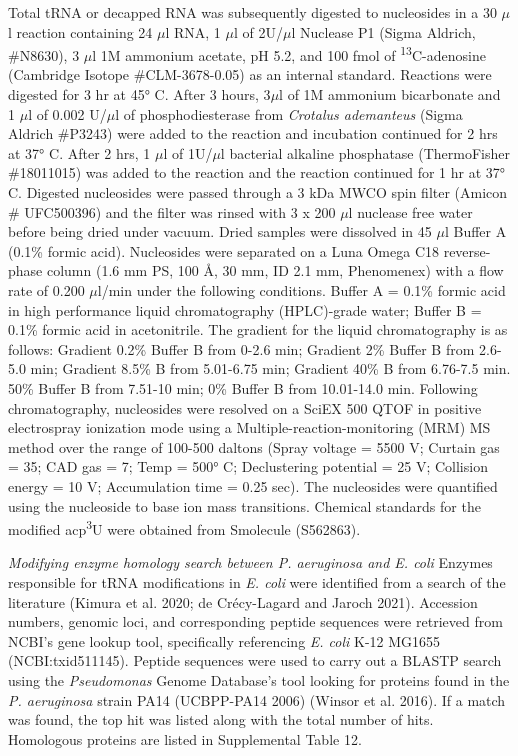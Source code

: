 \documentclass[times, twoside]{zHenriquesLab-StyleBioRxiv}
\begin{document}
Total tRNA or decapped RNA was subsequently digested to nucleosides in a 30 \(\mu\)l reaction containing 24 \(\mu\)l RNA, 1 \(\mu\)l of 2U/\(\mu\)l Nuclease P1 (Sigma Aldrich, \#N8630), 3 \(\mu\)l 1M ammonium acetate, pH 5.2, and 100 fmol of \textsuperscript{13}C-adenosine (Cambridge Isotope \#CLM-3678-0.05) as an internal standard. Reactions were digested for 3 hr at 45° C. After 3 hours, 3\(\mu\)l of 1M ammonium bicarbonate and 1 \(\mu\)l of 0.002 U/\(\mu\)l of phosphodiesterase from \textit{Crotalus ademanteus} (Sigma Aldrich \#P3243) were added to the reaction and incubation continued for 2 hrs at 37° C. After 2 hrs, 1 \(\mu\)l of 1U/\(\mu\)l bacterial alkaline phosphatase (ThermoFisher \#18011015) was added to the reaction and the reaction continued for 1 hr at 37° C. Digested nucleosides were passed through a 3 kDa MWCO spin filter (Amicon \# UFC500396) and the filter was rinsed with 3 x 200 \(\mu\)l nuclease free water before being dried under vacuum. Dried samples were dissolved in 45 \(\mu\)l Buffer A (0.1\% formic acid). Nucleosides were separated on a Luna Omega C18 reverse-phase column (1.6 mm PS, 100 Å, 30 mm, ID 2.1 mm, Phenomenex) with a flow rate of 0.200 \(\mu\)l/min under the following conditions. Buffer A = 0.1\% formic acid in high performance liquid chromatography (HPLC)-grade water; Buffer B = 0.1\% formic acid in acetonitrile. The gradient for the liquid chromatography is as follows: Gradient 0.2\% Buffer B from 0-2.6 min; Gradient 2\% Buffer B from 2.6-5.0 min; Gradient 8.5\% B from 5.01-6.75 min; Gradient 40\% B from 6.76-7.5 min. 50\% Buffer B from 7.51-10 min; 0\% Buffer B from 10.01-14.0 min. Following chromatography, nucleosides were resolved on a SciEX 500 QTOF in positive electrospray ionization mode using a Multiple-reaction-monitoring (MRM) MS method over the range of 100-500 daltons (Spray voltage = 5500 V; Curtain gas = 35; CAD gas = 7; Temp = 500° C; Declustering potential = 25 V; Collision energy = 10 V; Accumulation time = 0.25 sec). The nucleosides were quantified using the nucleoside to base ion mass transitions. Chemical standards for the modified acp\textsuperscript{3}U were obtained from Smolecule (S562863). 

\textit{Modifying enzyme homology search between P. aeruginosa and E. coli}
\newline
Enzymes responsible for tRNA modifications in \textit{E. coli} were identified from a search of the literature (Kimura et al. 2020; de Crécy-Lagard and Jaroch 2021). Accession numbers, genomic loci, and corresponding peptide sequences were retrieved from NCBI’s gene lookup tool, specifically referencing \textit{E. coli} K-12 MG1655 (NCBI:txid511145). Peptide sequences were used to carry out a BLASTP search using the \textit{Pseudomonas} Genome Database’s tool looking for proteins found in the \textit{P. aeruginosa} strain PA14 (UCBPP-PA14 2006) (Winsor et al. 2016). If a match was found, the top hit was listed along with the total number of hits. Homologous proteins are listed in Supplemental Table 12. 
\newline
\end{document}

